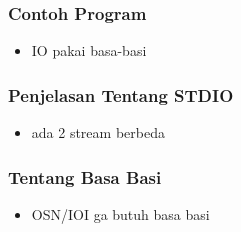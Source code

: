 \documentclass{beamer}
\begin{document}
\begin{frame}
\frametitle{Contoh Program}
\begin{itemize}
	\item IO pakai basa-basi
\end{itemize}
\end{frame}

\begin{frame}
\frametitle{Penjelasan Tentang STDIO}
\begin{itemize}
	\item ada 2 stream berbeda
\end{itemize}
\end{frame}

\begin{frame}
\frametitle{Tentang Basa Basi}
\begin{itemize}
	\item OSN/IOI ga butuh basa basi
\end{itemize}
\end{frame}
\end{document}
